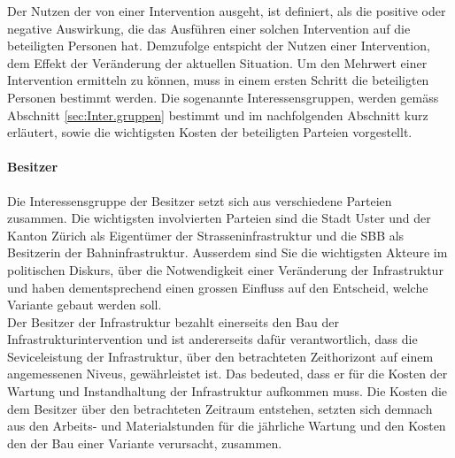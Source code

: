%
%
%
%

\label{subsec:Gruppen}

Der Nutzen der von einer Intervention ausgeht, ist definiert, als die positive oder negative Auswirkung, die das Ausführen einer solchen Intervention auf die beteiligten Personen hat. Demzufolge entspicht der Nutzen einer Intervention, dem Effekt der Veränderung der aktuellen Situation. Um den Mehrwert einer Intervention ermitteln zu können, muss in einem ersten Schritt die beteiligten Personen bestimmt werden. Die sogenannte Interessensgruppen, werden gemäss Abschnitt \ref{sec:Inter.gruppen} bestimmt und im nachfolgenden Abschnitt kurz erläutert, sowie die wichtigsten Kosten der beteiligten Parteien vorgestellt.

\paragraph{Besitzer}

Die Interessensgruppe der Besitzer setzt sich aus verschiedene Parteien zusammen. Die wichtigsten involvierten Parteien sind die Stadt Uster und der Kanton Zürich als Eigentümer der Strasseninfrastruktur und die SBB als Besitzerin der Bahninfrastruktur. 
Ausserdem sind Sie die wichtigsten Akteure im politischen Diskurs, über die Notwendigkeit einer Veränderung der Infrastruktur und haben dementsprechend einen grossen Einfluss auf den Entscheid, welche Variante gebaut werden soll. \\ 
Der Besitzer der Infrastruktur bezahlt einerseits den Bau der Infrastrukturintervention und ist andererseits dafür verantwortlich, dass die Seviceleistung der Infrastruktur, über den betrachteten Zeithorizont auf einem angemessenen Niveus, gewährleistet ist. Das bedeuted, dass er für die Kosten der Wartung und Instandhaltung der Infrastruktur aufkommen muss. Die Kosten die dem Besitzer über den betrachteten Zeitraum entstehen, setzten sich demnach aus den Arbeits- und Materialstunden für die jährliche Wartung und den Kosten den der Bau einer Variante verursacht, zusammen. 


